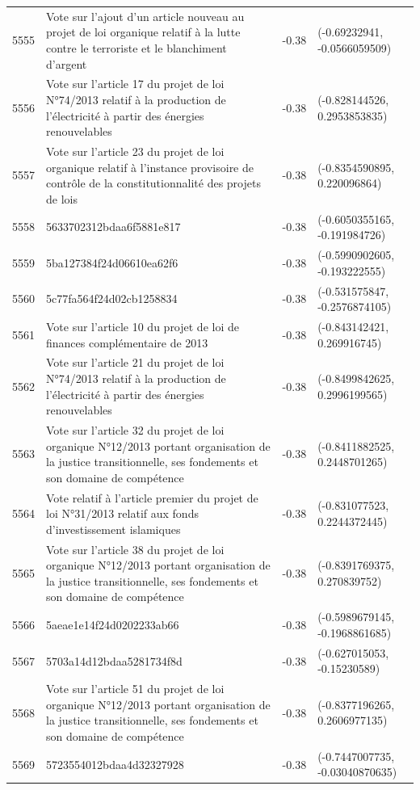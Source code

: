 \begin{table}[ht]
\begin{tabular}{rlrl}
  5555 & Vote sur l'ajout d'un article nouveau au projet de loi organique relatif à la lutte contre le terroriste et le blanchiment d'argent & -0.38 & (-0.69232941, -0.0566059509) \\ 
  5556 & Vote sur l'article 17 du projet de loi N°74/2013 relatif à la production de l'électricité à partir des énergies renouvelables & -0.38 & (-0.828144526, 0.2953853835) \\ 
  5557 & Vote sur l'article 23 du projet de loi organique relatif à l'instance provisoire de contrôle de la constitutionnalité des projets de lois & -0.38 & (-0.8354590895, 0.220096864) \\ 
  5558 & 5633702312bdaa6f5881e817 & -0.38 & (-0.6050355165, -0.191984726) \\ 
  5559 & 5ba127384f24d06610ea62f6 & -0.38 & (-0.5990902605, -0.193222555) \\ 
  5560 & 5c77fa564f24d02cb1258834 & -0.38 & (-0.531575847, -0.2576874105) \\ 
  5561 & Vote sur l'article 10 du projet de loi de finances complémentaire de 2013 & -0.38 & (-0.843142421, 0.269916745) \\ 
  5562 & Vote sur l'article 21 du projet de loi N°74/2013 relatif à la production de l'électricité à partir des énergies renouvelables & -0.38 & (-0.8499842625, 0.2996199565) \\ 
  5563 & Vote sur l'article 32 du projet de loi organique N°12/2013 portant organisation de la justice transitionnelle, ses fondements et son domaine de compétence & -0.38 & (-0.8411882525, 0.2448701265) \\ 
  5564 & Vote relatif à l'article premier du projet de loi N°31/2013 relatif aux fonds d'investissement islamiques & -0.38 & (-0.831077523, 0.2244372445) \\ 
  5565 & Vote sur l'article 38 du projet de loi organique N°12/2013 portant organisation de la justice transitionnelle, ses fondements et son domaine de compétence & -0.38 & (-0.8391769375, 0.270839752) \\ 
  5566 & 5aeae1e14f24d0202233ab66 & -0.38 & (-0.5989679145, -0.1968861685) \\ 
  5567 & 5703a14d12bdaa5281734f8d & -0.38 & (-0.627015053, -0.15230589) \\ 
  5568 & Vote sur l'article 51 du projet de loi organique N°12/2013 portant organisation de la justice transitionnelle, ses fondements et son domaine de compétence & -0.38 & (-0.8377196265, 0.2606977135) \\ 
  5569 & 5723554012bdaa4d32327928 & -0.38 & (-0.7447007735, -0.03040870635) \\ 

\end{tabular}
\end{table}
